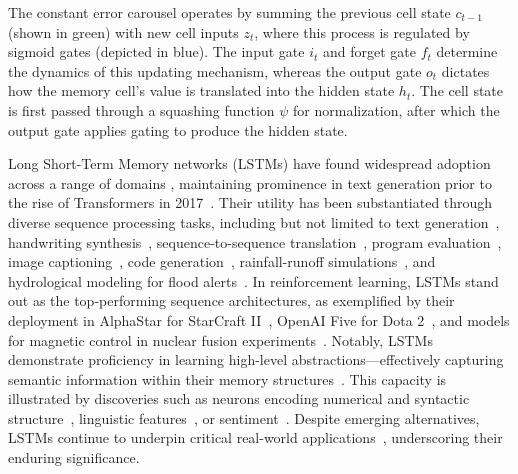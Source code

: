 The constant error carousel operates by summing the previous cell state $c_{t-1}$ (shown in green) with new cell inputs $z_t$, where this process is regulated by sigmoid gates (depicted in blue). The input gate $i_t$ and forget gate $f_t$ determine the dynamics of this updating mechanism, whereas the output gate $o_t$ dictates how the memory cell's value is translated into the hidden state $h_t$. The cell state is first passed through a squashing function $\psi$ for normalization, after which the output gate applies gating to produce the hidden state.

Long Short-Term Memory networks (LSTMs) have found widespread adoption across a range of domains \citep{Hochreiter:01,Hochreiter:07,Schmidhuber:15}, maintaining prominence in text generation prior to the rise of Transformers in 2017~\citep{Vaswani:17}. Their utility has been substantiated through diverse sequence processing tasks, including but not limited to text generation~\citep{Graves:13,Karpathy:15blog}, handwriting synthesis~\citep{Graves:13}, sequence-to-sequence translation~\citep{Sutskever:14nips}, program evaluation~\citep{Zaremba:14arxiv}, image captioning~\citep{Karpathy:15,Hossain:19}, code generation~\citep{Karpathy:15blog}, rainfall-runoff simulations~\citep{Kratzert:18,Kratzert:19}, and hydrological modeling for flood alerts~\citep{Nearing:24}. In reinforcement learning, LSTMs stand out as the top-performing sequence architectures, as exemplified by their deployment in AlphaStar for StarCraft II~\citep{Vinyals:17short}, OpenAI Five for Dota 2~\citep{OpenAI:19}, and models for magnetic control in nuclear fusion experiments~\citep{Degrave:22short}. Notably, LSTMs demonstrate proficiency in learning high-level abstractions—effectively capturing semantic information within their memory structures~\citep{Karpathy:15blog}. This capacity is illustrated by discoveries such as neurons encoding numerical and syntactic structure~\citep{Lakretz:19}, linguistic features~\citep{Bau:19}, or sentiment~\citep{Radford:17arxiv}. Despite emerging alternatives, LSTMs continue to underpin critical real-world applications~\citep{Degrave:22short,Nearing:24}, underscoring their enduring significance.

